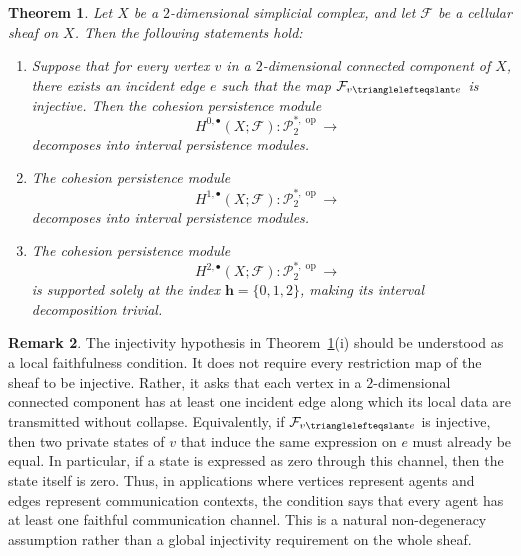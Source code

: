 \documentclass[reqno,12pt]{amsart}
\newcommand{\face}{{\trianglelefteqslant}}
\newcommand{\cF}{{\mathcal F}}
\newcommand{\cP}{\mathcal{P}}
\DeclareMathOperator{\vect}{\mathbf{vect}_\Bbbk}
\DeclareMathOperator{\op}{op}
\newcommand{\0}{\mathbf 0}
\newcommand{\h}{\mathbf{h}}
\newtheorem{theorem}{Theorem}[section]
\theoremstyle{definition}
\newtheorem{remark}[theorem]{Remark}
\begin{document}
\begin{theorem}\label{Thm:DescomposicionCohesiveDim2}
Let $X$ be a $2$-dimensional simplicial complex, and let $\cF$ be a cellular sheaf on $X$. Then the following statements hold:

\begin{enumerate}[label=(\roman*)]
    \item Suppose that for every vertex $v$ in a $2$-dimensional connected component of $X$, there exists an incident edge $e$ such that the map $\cF_{v\face e}$ is injective. Then the cohesion persistence module
    \[
        H^{0,\bullet}(X;\cF)\colon
        \cP^{*,\op}_2
        \longrightarrow \vect
    \]
    decomposes into interval persistence modules.
    \item The cohesion persistence module
    \[
        H^{1,\bullet}(X;\cF)\colon
        \cP^{*,\op}_2
        \longrightarrow \vect
    \]
    decomposes into interval persistence modules.
    \item The cohesion persistence module
    \[
        H^{2,\bullet}(X;\cF)\colon
        \cP^{*,\op}_2
        \longrightarrow \vect
    \]
    is supported solely at the index $\h=\{0,1,2\}$, making its interval decomposition trivial.
    \end{enumerate}
\end{theorem}
\begin{remark}
The injectivity hypothesis in Theorem~\ref{Thm:DescomposicionCohesiveDim2}(i) should be understood as a local faithfulness condition. It does not require every restriction map of the sheaf to be injective. Rather, it asks that each vertex in a $2$-dimensional connected component has at least one incident edge along which its local data are transmitted without collapse. Equivalently, if $\cF_{v\face e}$ is injective, then two private states of $v$ that induce the same expression on $e$ must already be equal. In particular, if a state is expressed as zero through this channel, then the state itself is zero. Thus, in applications where vertices represent agents and edges represent communication contexts, the condition says that every agent has at least one faithful communication channel. This is a natural non-degeneracy assumption rather than a global injectivity requirement on the whole sheaf.
\end{remark}
\end{document}
